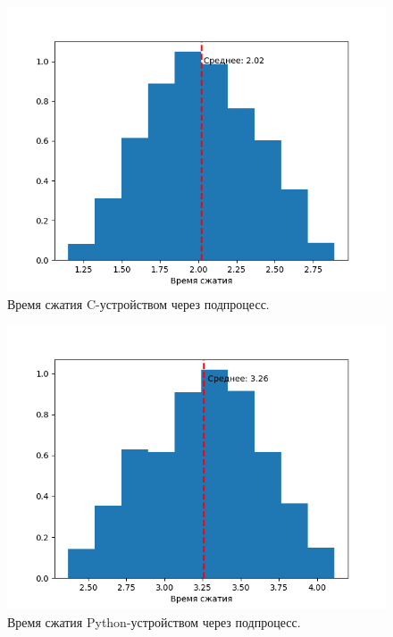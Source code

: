 \begin{figure}[!htbp]
    \centering
    \begin{adjustbox}{max totalsize={0.8\textwidth}{\textheight}}
        \includegraphics{images/hist-exec-c-dev.png}
    \end{adjustbox}
    \caption{Время сжатия C-устройством через подпроцесс.}\label{fig:hist-exec-c-dev}
\end{figure}

\begin{figure}[!htbp]
    \centering
    \begin{adjustbox}{max totalsize={0.8\textwidth}{\textheight}}
        \includegraphics{images/hist-exec-py-dev.png}
    \end{adjustbox}
    \caption{Время сжатия Python-устройством через подпроцесс.}\label{fig:hist-exec-py-dev}
\end{figure}



